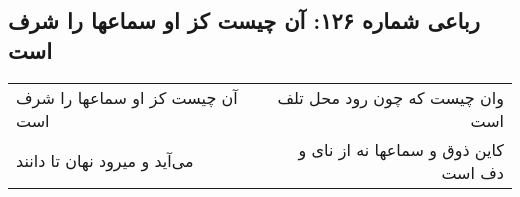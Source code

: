 \begin{center}
\section*{رباعی شماره ۱۲۶: آن چیست کز او سماعها را شرف است}
\label{sec:0126}
\begin{longtable}{l p{0.5cm} r}
آن چیست کز او سماعها را شرف است
&&
وان چیست که چون رود محل تلف است
\\
می‌آید و میرود نهان تا دانند
&&
کاین ذوق و سماعها نه از نای و دف است
\\
\end{longtable}
\end{center}
